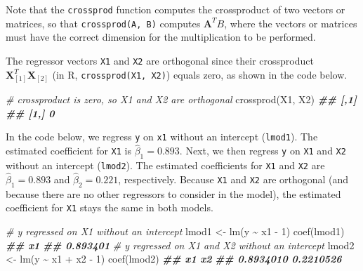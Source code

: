 \documentclass[
]{book}
\newenvironment{Shaded}{\begin{snugshade}}{\end{snugshade}}
\newcommand{\CommentTok}[1]{\textcolor[rgb]{0.56,0.35,0.01}{\textit{#1}}}
\newcommand{\DecValTok}[1]{\textcolor[rgb]{0.00,0.00,0.81}{#1}}
\newcommand{\DocumentationTok}[1]{\textcolor[rgb]{0.56,0.35,0.01}{\textbf{\textit{#1}}}}
\newcommand{\FunctionTok}[1]{\textcolor[rgb]{0.00,0.00,0.00}{#1}}
\newcommand{\NormalTok}[1]{#1}
\newcommand{\OtherTok}[1]{\textcolor[rgb]{0.56,0.35,0.01}{#1}}
\newcommand{\SpecialCharTok}[1]{\textcolor[rgb]{0.00,0.00,0.00}{#1}}
\theoremstyle{definition}
\theoremstyle{definition}
\theoremstyle{definition}
\theoremstyle{definition}
\theoremstyle{remark}
\begin{document}
Note that the \texttt{crossprod} function computes the crossproduct of two
vectors or matrices, so that \texttt{crossprod(A,\ B)} computes
\(\mathbf{A}^T B\), where the vectors or matrices must have the correct
dimension for the multiplication to be performed.

The regressor vectors \texttt{X1} and \texttt{X2} are orthogonal since their
crossproduct \(\mathbf{X}_{[1]}^T \mathbf{X}_{[2]}\) (in R,
\texttt{crossprod(X1,\ X2)}) equals zero, as shown in the code below.

\begin{Shaded}
\begin{Highlighting}[]
\CommentTok{\# crossproduct is zero, so X1 and X2 are orthogonal}
\FunctionTok{crossprod}\NormalTok{(X1, X2)}
\DocumentationTok{\#\#      [,1]}
\DocumentationTok{\#\# [1,]    0}
\end{Highlighting}
\end{Shaded}

In the code below, we regress \texttt{y} on \texttt{x1} without an intercept
(\texttt{lmod1}). The estimated coefficient for \texttt{X1} is \(\hat{\beta}_1=0.893\).
Next, we then regress \texttt{y} on \texttt{X1} and \texttt{X2} without an intercept
(\texttt{lmod2}). The estimated coefficients for \texttt{X1} and \texttt{X2} are
\(\hat{\beta}_1=0.893\) and \(\hat{\beta}_2=0.221\), respectively. Because
\texttt{X1} and \texttt{X2} are orthogonal (and because there are no other regressors
to consider in the model), the estimated coefficient for \texttt{X1} stays the
same in both models.

\begin{Shaded}
\begin{Highlighting}[]
\CommentTok{\# y regressed on X1 without an intercept}
\NormalTok{lmod1 }\OtherTok{\textless{}{-}} \FunctionTok{lm}\NormalTok{(y }\SpecialCharTok{\textasciitilde{}}\NormalTok{ x1 }\SpecialCharTok{{-}} \DecValTok{1}\NormalTok{)}
\FunctionTok{coef}\NormalTok{(lmod1)}
\DocumentationTok{\#\#       x1 }
\DocumentationTok{\#\# 0.893401}
\CommentTok{\# y regressed on X1 and X2 without an intercept}
\NormalTok{lmod2 }\OtherTok{\textless{}{-}} \FunctionTok{lm}\NormalTok{(y }\SpecialCharTok{\textasciitilde{}}\NormalTok{ x1 }\SpecialCharTok{+}\NormalTok{ x2 }\SpecialCharTok{{-}} \DecValTok{1}\NormalTok{)}
\FunctionTok{coef}\NormalTok{(lmod2)}
\DocumentationTok{\#\#        x1        x2 }
\DocumentationTok{\#\# 0.8934010 0.2210526}
\end{Highlighting}
\end{Shaded}
\end{document}
